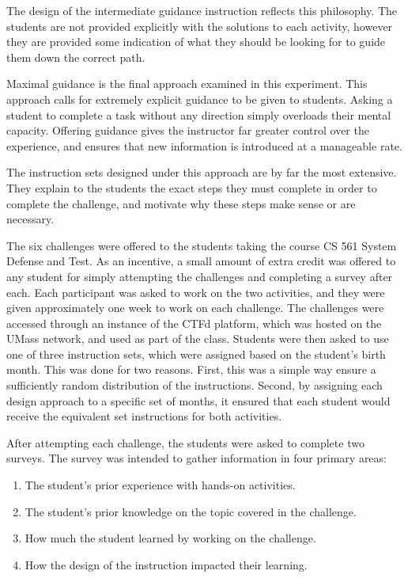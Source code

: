         The design of the intermediate guidance instruction reflects this philosophy. 
        The students are not provided explicitly with the solutions to each activity, however they are provided some indication of what they should be looking for to guide them down the correct path.

        Maximal guidance is the final approach examined in this experiment. 
        This approach calls for extremely explicit guidance to be given to students. 
        Asking a student to complete a task without any direction simply overloads their mental capacity. 
        Offering guidance gives the instructor far greater control over the experience, and ensures that new information is introduced at a manageable rate. 

        The instruction sets designed under this approach are by far the most extensive. 
        They explain to the students the exact steps they must complete in order to complete the challenge, and motivate why these steps make sense or are necessary. 

    The six challenges were offered to the students taking the course CS 561 System Defense and Test. 
    As an incentive, a small amount of extra credit was offered to any student for simply attempting the challenges and completing a survey after each. 
    Each participant was asked to work on the two activities, and they were given approximately one week to work on each challenge. 
    The challenges were accessed through an instance of the CTFd platform, which was hosted on the UMass network, and used as part of the class. 
    Students were then asked to use one of three instruction sets, which were assigned based on the student's birth month. 
    This was done for two reasons. 
    First, this was a simple way ensure a sufficiently random distribution of the instructions. 
    Second, by assigning each design approach to a specific set of months, it ensured that each student would receive the equivalent set instructions for both activities. 

    After attempting each challenge, the students were asked to complete two surveys. 
    The survey was intended to gather information in four primary areas:
    \begin{enumerate}
        \item The student's prior experience with hands-on activities.
        \item The student's prior knowledge on the topic covered in the challenge.
        \item How much the student learned by working on the challenge.
        \item How the design of the instruction impacted their learning. 
    \end{enumerate}
    
